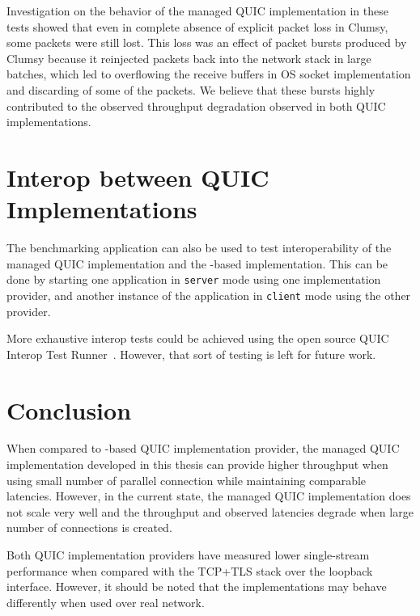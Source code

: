 Investigation on the behavior of the managed QUIC implementation in these tests showed that even in
complete absence of explicit packet loss in Clumsy, some packets were still lost. This loss was an
effect of packet bursts produced by Clumsy because it reinjected packets back into the network stack
in large batches, which led to overflowing the receive buffers in OS socket implementation and
discarding of some of the packets. We believe that these bursts highly contributed to the observed
throughput degradation observed in both QUIC implementations.



\section{Interop between QUIC Implementations}

The benchmarking application can also be used to test interoperability of the managed QUIC
implementation and the \libmsquic{}-based implementation. This can be done by starting one
application in \texttt{server} mode using one implementation provider, and another instance of the
application in \texttt{client} mode using the other provider.

More exhaustive interop tests could be achieved using the open source QUIC Interop Test
Runner~\cite{QuicInteropRunner}. However, that sort of testing is left for future work.

\section{Conclusion}


When compared to \libmsquic{}-based QUIC implementation provider, the managed QUIC implementation
developed in this thesis can provide higher throughput when using small number of parallel
connection while maintaining comparable latencies. However, in the current state, the managed QUIC
implementation does not scale very well and the throughput and observed latencies degrade when large
number of connections is created.

Both QUIC implementation providers have measured lower single-stream performance when compared with
the TCP+TLS stack over the loopback interface. However, it should be noted that the implementations
may behave differently when used over real network.

